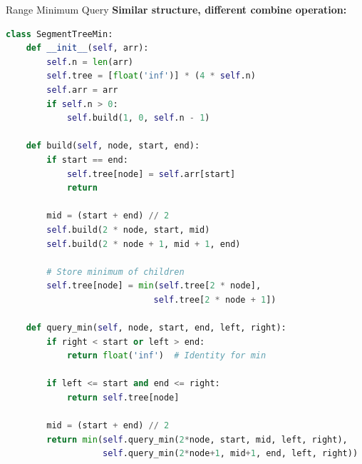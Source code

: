 \documentclass[aspectratio=169]{beamer}
\begin{document}
\begin{frame}[fragile]{Range Minimum Query}
  \textbf{Similar structure, different combine operation:}

  \begin{lstlisting}[language=Python, basicstyle=\ttfamily\footnotesize]
class SegmentTreeMin:
    def __init__(self, arr):
        self.n = len(arr)
        self.tree = [float('inf')] * (4 * self.n)
        self.arr = arr
        if self.n > 0:
            self.build(1, 0, self.n - 1)

    def build(self, node, start, end):
        if start == end:
            self.tree[node] = self.arr[start]
            return

        mid = (start + end) // 2
        self.build(2 * node, start, mid)
        self.build(2 * node + 1, mid + 1, end)

        # Store minimum of children
        self.tree[node] = min(self.tree[2 * node],
                             self.tree[2 * node + 1])

    def query_min(self, node, start, end, left, right):
        if right < start or left > end:
            return float('inf')  # Identity for min

        if left <= start and end <= right:
            return self.tree[node]

        mid = (start + end) // 2
        return min(self.query_min(2*node, start, mid, left, right),
                   self.query_min(2*node+1, mid+1, end, left, right))
  \end{lstlisting}
\end{frame}
\end{document}
